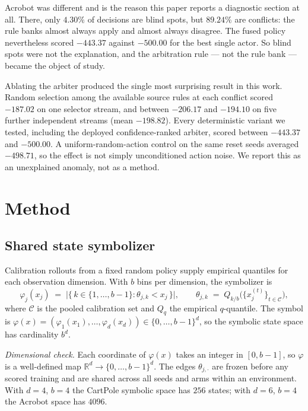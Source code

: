 \documentclass[11pt,a4paper]{article}
\begin{document}
Acrobot was different and is the reason this paper reports a diagnostic section at all. There, only $4.30\%$ of decisions are blind spots, but $89.24\%$ are conflicts: the rule banks almost always apply and almost always disagree. The fused policy nevertheless scored $-443.37$ against $-500.00$ for the best single actor. So blind spots were not the explanation, and the arbitration rule --- not the rule bank --- became the object of study.

Ablating the arbiter produced the single most surprising result in this work. Random selection among the available source rules at each conflict scored $-187.02$ on one selector stream, and between $-206.17$ and $-194.10$ on five further independent streams (mean $-198.82$). Every deterministic variant we tested, including the deployed confidence-ranked arbiter, scored between $-443.37$ and $-500.00$. A uniform-random-action control on the same reset seeds averaged $-498.71$, so the effect is not simply unconditioned action noise. We report this as an unexplained anomaly, not as a method.

\section{Method}
\label{sec:method}

\subsection{Shared state symbolizer}
\label{sec:method-symbolizer}

Calibration rollouts from a fixed random policy supply empirical quantiles for each observation dimension. With $b$ bins per dimension, the symbolizer is
\begin{equation}
\label{eq:sym}
\varphi_{j}(x_{j}) \;=\; \bigl|\{\,k\in\{1,\dots,b-1\} : \theta_{j,k} < x_{j}\,\}\bigr|,
\qquad
\theta_{j,k} \;=\; Q_{k/b}\bigl(\{x_{j}^{(t)}\}_{t\in\mathcal{C}}\bigr),
\end{equation}
where $\mathcal{C}$ is the pooled calibration set and $Q_{q}$ the empirical $q$-quantile. The symbol is $\varphi(x) = (\varphi_{1}(x_{1}),\dots,\varphi_{d}(x_{d})) \in \{0,\dots,b-1\}^{d}$, so the symbolic state space has cardinality $b^{d}$.

\emph{Dimensional check.} Each coordinate of $\varphi(x)$ takes an integer in $[0,b-1]$, so $\varphi$ is a well-defined map $\mathbb{R}^{d}\to\{0,\dots,b-1\}^{d}$. The edges $\theta_{j,\cdot}$ are frozen before any scored training and are shared across all seeds and arms within an environment. With $d=4$, $b=4$ the CartPole symbolic space has $256$ states; with $d=6$, $b=4$ the Acrobot space has $4096$.
\end{document}
